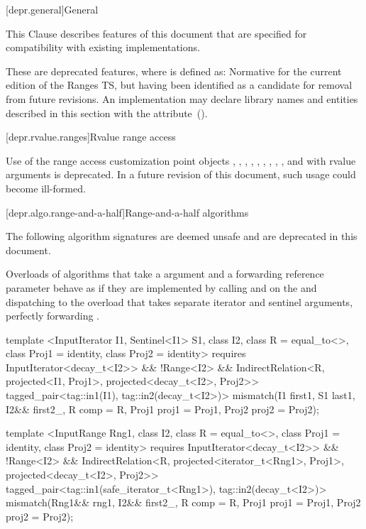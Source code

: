 
[depr.general]{General}

\pnum
This Clause describes features of this document that are specified for compatibility with
existing implementations.

\pnum
These are deprecated features, where
is defined as:
Normative for the current edition of the Ranges TS,
but having been identified as a candidate for removal from future revisions.
An implementation may declare library names and entities described in this section with the
 attribute~().

[depr.rvalue.ranges]{Rvalue range access}

\pnum
Use of the range access customization point objects
, ,
, ,
, ,
, ,
, and 
with rvalue arguments is deprecated. In a future revision of this document,
such usage could become ill-formed.

[depr.algo.range-and-a-half]{Range-and-a-half algorithms}

\pnum
The following algorithm signatures are deemed unsafe and are deprecated in this document.

\pnum
Overloads of algorithms that take a  argument and a forwarding
reference parameter  behave as if they are implemented by calling
 and  on the  and dispatching to the
overload that takes separate iterator and sentinel arguments, perfectly forwarding
.

\begin{codeblock}
template <InputIterator I1, Sentinel<I1> S1, class I2, class R = equal_to<>,
    class Proj1 = identity, class Proj2 = identity>
  requires InputIterator<decay_t<I2>> && !Range<I2> &&
    IndirectRelation<R, projected<I1, Proj1>, projected<decay_t<I2>, Proj2>>
  tagged_pair<tag::in1(I1), tag::in2(decay_t<I2>)>
    mismatch(I1 first1, S1 last1, I2&& first2_, R comp = R{},
             Proj1 proj1 = Proj1{}, Proj2 proj2 = Proj2{});

template <InputRange Rng1, class I2, class R = equal_to<>,
    class Proj1 = identity, class Proj2 = identity>
  requires InputIterator<decay_t<I2>> && !Range<I2> &&
    IndirectRelation<R, projected<iterator_t<Rng1>, Proj1>, projected<decay_t<I2>, Proj2>>
  tagged_pair<tag::in1(safe_iterator_t<Rng1>), tag::in2(decay_t<I2>)>
    mismatch(Rng1&& rng1, I2&& first2_, R comp = R{},
             Proj1 proj1 = Proj1{}, Proj2 proj2 = Proj2{});
\end{codeblock}

